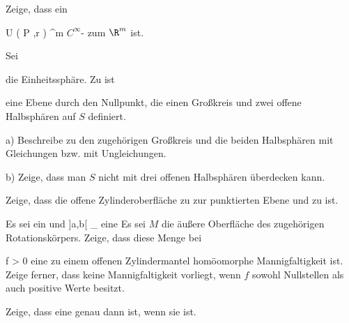 {}
{

Zeige, dass ein

\mavergleichskette
{\vergleichskette
{ U \left(   P ,r  \right)
}
{ \subseteq }{ \R^m
}
{  }{
}
{    }{
}
{   }{
}
}
{}{}{}
$C^\infty$-
zum $\R^m$ ist.

}
{} {}

{}
{

Sei

 {  }

die Einheitssphäre. Zu
 ist

 {  }

eine Ebene durch den Nullpunkt, die einen Großkreis
 {} {}
und zwei offene Halbsphären auf $S$ definiert.

a) Beschreibe zu
 den zugehörigen Großkreis und die beiden Halbsphären mit Gleichungen bzw. mit Ungleichungen.

b) Zeige, dass man $S$ nicht mit drei offenen Halbsphären überdecken kann.

}
{} {}

{}
{

Zeige, dass die offene Zylinderoberfläche
\mathl{S^1 \times {]0,1[}}{} zu
 zur punktierten Ebene
 und zu
ist.

}
{} {}

{}
{

Es sei
\mathl{]a,b[}{} ein
und
 {]a,b[} {\R_{}
} {}
eine
Es sei $M$ die äußere Oberfläche des zugehörigen Rotationskörpers. Zeige, dass diese Menge bei

\mavergleichskette
{\vergleichskette
{ f
}
{ > }{ 0
}
{  }{
}
{    }{
}
{   }{
}
}
{}{}{}
eine zu einem offenen Zylindermantel homöomorphe Mannigfaltigkeit ist. Zeige ferner, dass keine Mannigfaltigkeit vorliegt, wenn $f$ sowohl Nullstellen als auch positive Werte besitzt.

}
{} {}

{}
{

Zeige, dass eine
genau dann
ist, wenn sie
ist.

}
{} {}

